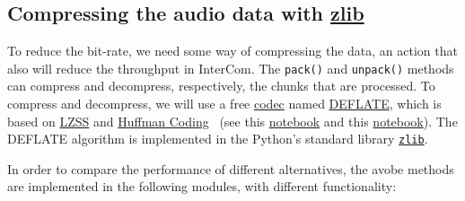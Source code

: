 \subsection{Compressing the audio data with \href{https://zlib.net/}{zlib}}
To reduce the bit-rate, we need some way of compressing the data, an
action that also will reduce the throughput in InterCom. The
\verb|pack()| and \verb|unpack()| methods can compress and
decompress, respectively, the chunks that are processed. To compress
and decompress, we will use a free
\href{https://en.wikipedia.org/wiki/Codec}{codec} named
\href{https://en.wikipedia.org/wiki/DEFLATE}{DEFLATE}, which is based
on
\href{https://en.wikipedia.org/wiki/Lempel%E2%80%93Ziv%E2%80%93Storer%E2%80%93Szymanski}{LZSS}
  and \href{https://en.wikipedia.org/wiki/Huffman_coding}{Huffman
    Coding}~\cite{nelson96datacompression} (see this
  \href{https://github.com/vicente-gonzalez-ruiz/LZ77/blob/master/index.ipynb}{notebook} and
  this
  \href{https://github.com/vicente-gonzalez-ruiz/Huffman_coding/blob/master/index.ipynb}{notebook}). The
  DEFLATE algorithm is implemented in the Python's standard library
  \href{https://docs.python.org/3/library/zlib.html}{\texttt{zlib}}. %

In order to compare the performance of different alternatives, the
avobe methods are implemented in the following modules, with different
functionality:

